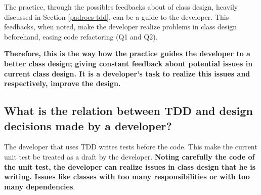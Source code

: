 \documentclass[conference]{IEEEtran}
\begin{document}
The practice, through the possibles feedbacks about of class design, heavily
discussed in Section \ref{padroes-tdd}, can be a guide to the developer.
This feedbacks, when noted, make the developer realize problems in class
design beforehand, easing code refactoring (Q1 and Q2).


\textbf{Therefore, this is the way how the practice guides the developer to
a better class design; giving constant feedback about potential issues in
current class design. It is a developer's task to realize this issues and
respectively, improve the design. }


\subsection{What is the relation between TDD and design decisions made by
a developer?}


The developer that uses TDD writes tests before the code. This make
the current unit test be treated as a draft by the developer.
\textbf{Noting carefully the code of the unit test, the developer can
realize issues in class design that he is writing. Issues like 
classes with too many responsibilities or with too many dependencies}.

\end{document}

